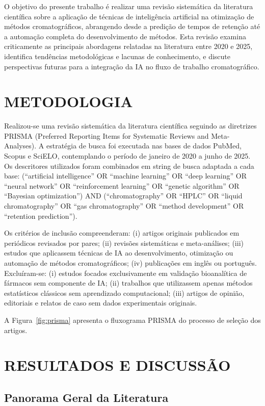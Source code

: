 \documentclass[preprint,12pt]{elsarticle}
\begin{document}
O objetivo do presente trabalho é realizar uma revisão sistemática da literatura científica sobre a aplicação de técnicas de inteligência artificial na otimização de métodos cromatográficos, abrangendo desde a predição de tempos de retenção até a automação completa do desenvolvimento de métodos. Esta revisão examina criticamente as principais abordagens relatadas na literatura entre 2020 e 2025, identifica tendências metodológicas e lacunas de conhecimento, e discute perspectivas futuras para a integração da IA no fluxo de trabalho cromatográfico.

\section{METODOLOGIA}

Realizou-se uma revisão sistemática da literatura científica seguindo as diretrizes PRISMA (Preferred Reporting Items for Systematic Reviews and Meta-Analyses). A estratégia de busca foi executada nas bases de dados PubMed, Scopus e SciELO, contemplando o período de janeiro de 2020 a junho de 2025. Os descritores utilizados foram combinados em string de busca adaptada a cada base: (``artificial intelligence'' OR ``machine learning'' OR ``deep learning'' OR ``neural network'' OR ``reinforcement learning'' OR ``genetic algorithm'' OR ``Bayesian optimization'') AND (``chromatography'' OR ``HPLC'' OR ``liquid chromatography'' OR ``gas chromatography'' OR ``method development'' OR ``retention prediction'').

Os critérios de inclusão compreenderam: (i) artigos originais publicados em periódicos revisados por pares; (ii) revisões sistemáticas e meta-análises; (iii) estudos que aplicassem técnicas de IA ao desenvolvimento, otimização ou automação de métodos cromatográficos; (iv) publicações em inglês ou português. Excluíram-se: (i) estudos focados exclusivamente em validação bioanalítica de fármacos sem componente de IA; (ii) trabalhos que utilizassem apenas métodos estatísticos clássicos sem aprendizado computacional; (iii) artigos de opinião, editoriais e relatos de caso sem dados experimentais originais.

A Figura~\ref{fig:prisma} apresenta o fluxograma PRISMA do processo de seleção dos artigos.

\section{RESULTADOS E DISCUSSÃO}

\subsection{Panorama Geral da Literatura}
\end{document}
